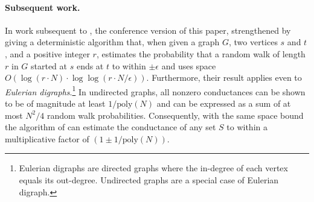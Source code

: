 \documentclass{toc}
\newcommand{\poly}{\mathrm{poly}}
\numberwithin{myalgctr}{section}
\theoremstyle{named}
\begin{document}
\paragraph{Subsequent work.}
%
In work subsequent to \cite{conf-version}, the conference version of this
paper,  %
\cite{akmpsv19} strengthened  by giving a deterministic algorithm that, when given a graph $G$, two vertices $s$ and $t$, and a positive integer $r$, estimates the probability that a random walk of length $r$ in $G$ started at $s$ ends at $t$ to within $\pm\epsilon$ and uses space $O(\log (r\cdot N)\cdot\log\log(r\cdot N/\epsilon))$. Furthermore, their result applies even to \emph{Eulerian digraphs}.\footnote{Eulerian digraphs are directed graphs where the in-degree of each vertex 
equals its out-degree. Undirected graphs are a special case of Eulerian
%
digraph.}   %
In undirected graphs, all nonzero conductances can be shown to be of magnitude at least $1/\poly(N)$ and can be expressed as a sum of at most $N^2/4$ random walk probabilities.  Consequently, with the same space bound the algorithm of \cite{akmpsv19} can estimate the conductance of any set $S$ to within a multiplicative factor of $(1\pm 1/\poly(N))$.
\fi 
\end{document}

